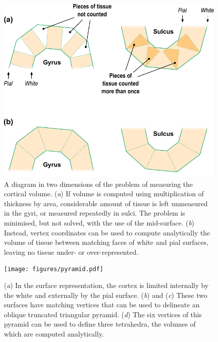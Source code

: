 \begin{figure}[!tp]
\begin{center}
\includegraphics[scale=.9]{figures/mantle.pdf}
\caption[A \textsc{2-d} diagram of the problem of measuring the cortical volume.]{A diagram in two dimensions of the problem of measuring the cortical volume. (\emph{a}) If volume is computed using multiplication of thickness by area, considerable amount of tissue is left unmeasured in the gyri, or measured repeatedly in sulci. The problem is minimised, but not solved, with the use of the mid-surface. (\emph{b}) Instead, vertex coordinates can be used to compute analytically the volume of tissue between matching faces of white and pial surfaces, leaving no tissue under- or over-represented.}
\label{fig:mantle} 
\end{center}
\end{figure}

\begin{figure}[!tp]
\begin{center}
\hspace*{-.7cm}
\texttt{[image: figures/pyramid.pdf]}
\caption[A \textsc{3-d} diagram with the proposed solution to measure the cortical volume.]{(\emph{a}) In the surface representation, the cortex is limited internally by the white and externally by the pial surface. (\emph{b}) and (\emph{c}) These two surfaces have matching vertices that can be used to delineate an oblique truncated triangular pyramid. (\emph{d}) The six vertices of this pyramid can be used to define three tetrahedra, the volumes of which are computed analytically.}
\label{fig:pyramid}
\end{center}
\end{figure}

